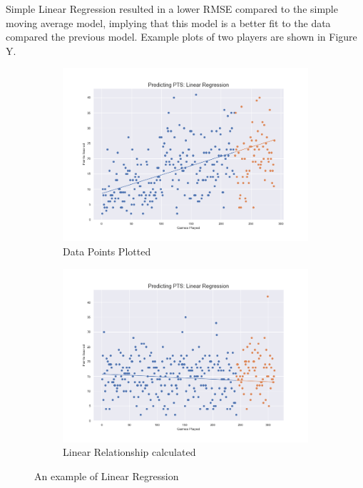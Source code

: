\documentclass[a4paper,11pt,twoside]{article}
\begin{document}
Simple Linear Regression resulted in a lower RMSE compared to the simple moving average model, implying that this model is a better fit to the data compared the previous model. Example plots of two players are shown in Figure Y. 

\begin{figure} [h!]
  \centering
  \begin{subfigure}[b]{0.49\textwidth}
    \includegraphics[width=\textwidth]{../players_lr/player24.png}
    \caption{Data Points Plotted}
    \label{fig:1}
  \end{subfigure}
  \begin{subfigure}[b]{0.49\textwidth}
    \includegraphics[width=\textwidth]{../players_lr/player26.png}
    \caption{Linear Relationship calculated}
    \label{fig:2}
  \end{subfigure}
  \caption{An example of Linear Regression}
  \label{fig:3}
\end{figure}
\end{document}
